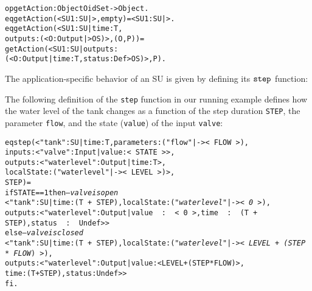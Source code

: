\small
\begin{alltt}
  op getAction : Object OidSet -> Object .
  eq getAction(< SU1 : SU | >, empty) = < SU1 : SU | > .
  eq getAction(< SU1 : SU | time : T, 
                            outputs : (< O : Output | > OS) >, (O , P)) = 
     getAction(< SU1 : SU | outputs : 
                     (< O : Output | time : T, status : Def > OS) >, P) .
\end{alltt}
\normalsize



\noindent The application-specific behavior of an SU is given by
defining its $\mathtt{step}_{}$ 
function:

\begin{example}
The following definition of the \texttt{step} function in our running
example  defines how the  water level of the tank changes as a
function of the 
step duration \texttt{STEP}, the parameter \texttt{flow}, and the
state (\texttt{value}) of the input \texttt{valve}:

\scriptsize
\begin{alltt}
eq step(< "tank" : SU | time : T, parameters : ("flow" |-> <\,FLOW\,>), 
                        inputs : < "valve" : Input | value : <\,STATE\,> >, 
                        outputs : < "waterlevel" : Output | time : T >,
                        localState : ("waterlevel" |-> <\,LEVEL\,>) >,
        STEP) = 
  if STATE == 1 then    \emph{--- valve is open}
    < "tank" : SU | time : (T\,+\,STEP), localState : (\emph{"waterlevel" |-> <\,0\,>}),
          outputs : < "waterlevel" : Output | value\,\,:\,\,<\,0\,>, time\,\,:\,\,(T\,+\,STEP), status\,\,:\,\,Undef > >
  else                  \emph{--- valve is closed}
    < "tank" : SU | time : (T\,+\,STEP),  localState : (\emph{"waterlevel" |-> <\,LEVEL\,+\,(STEP\,*\,FLOW})\,>), 
                    outputs : < "waterlevel" : Output | value : < LEVEL + (STEP * FLOW) >, 
                                                        time : (T + STEP), status : Undef > > 
  fi .
\end{alltt}
\normalsize
\end{example}

